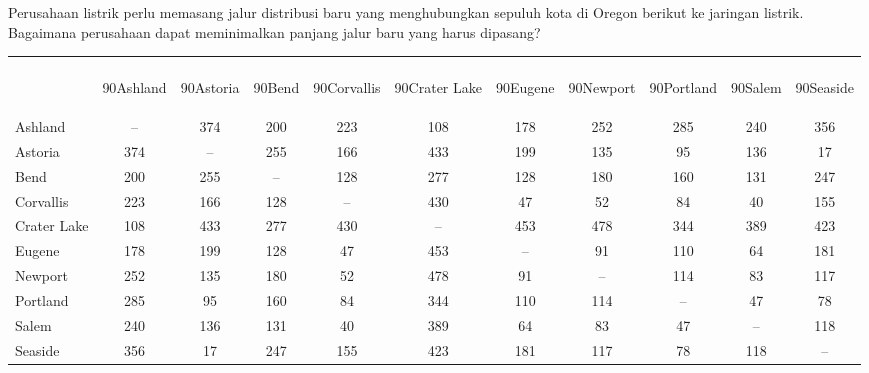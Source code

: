 \begin{example}{} %
Perusahaan listrik perlu memasang jalur distribusi baru yang menghubungkan sepuluh kota di Oregon berikut ke jaringan listrik.  Bagaimana perusahaan dapat meminimalkan panjang jalur baru yang harus dipasang?
 
\begin{center}
\small
\begin{tabular}{|l|c|c|c|c|c|c|c|c|c|c|}
\hline
&&&&&&&&&&\\[7ex]
& \begin{rotate}{90}Ashland \end{rotate}& \begin{rotate}{90}Astoria\end{rotate}  & \begin{rotate}{90}Bend \end{rotate}& \begin{rotate}{90}Corvallis \end{rotate} & \begin{rotate}{90}Crater Lake \end{rotate} &  \begin{rotate}{90}Eugene  \end{rotate}&  \begin{rotate}{90}Newport \end{rotate} &  \begin{rotate}{90}Portland  \end{rotate}& \begin{rotate}{90}Salem \end{rotate} &  \begin{rotate}{90}Seaside \end{rotate}\\
\hline
Ashland & --&374&200&223&108&178&252&285&240&356\\
\hline
Astoria & 374&--&255&166&433&199&135&95&136&17\\
\hline
Bend & 200 & 255 &--&128&277&128&180 & 160&131&247\\
\hline
Corvallis&223&166&128&--&430&47&52&84&40&155\\
\hline
Crater Lake &108&433&277&430&--&453&478&344&389&423\\
\hline
Eugene &178&199&128&47&453&--&91&110&64&181\\
\hline
Newport&252&135&180&52&478&91&--&114&83&117\\
\hline
Portland &285&95&160&84&344&110&114&--&47&78\\
\hline
Salem & 240 &136&131&40&389&64&83&47&--&118\\
\hline
Seaside&356&17&247&155&423&181&117&78&118&--\\
\hline
\end{tabular}
\end{center}


\end{example}
